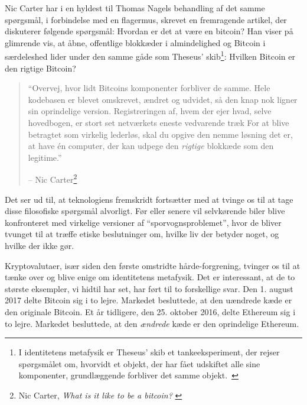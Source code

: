 \documentclass[paper=6in:9in,pagesize=pdftex,headinclude=on,footinclude=on,12pt]{scrbook}
\begin{document}
Nic Carter har i en hyldest til Thomas Nagels behandling af det samme spørgsmål, i forbindelse med en flagermus, skrevet en fremragende artikel, der diskuterer følgende spørgsmål: Hvordan er det at være en bitcoin? Han viser på glimrende vis, at åbne, offentlige blokkæder i almindelighed og Bitcoin i særdeleshed lider under den samme gåde som Theseus' skib\footnote{I identitetens metafysik er Theseus' skib et tankeeksperiment, der rejser spørgsmålet om, hvorvidt et objekt, der har fået udskiftet alle sine komponenter, grundlæggende forbliver det samme objekt.~\cite{wiki:theseus}}: Hvilken Bitcoin er den rigtige Bitcoin?\begin{quotation}\begin{samepage} \enquote{Overvej, hvor lidt Bitcoins komponenter forbliver de samme. Hele kodebasen er blevet omskrevet, ændret og udvidet, så den knap nok ligner sin oprindelige version. \href{...}{} Registreringen af, hvem der ejer hvad, selve hovedbogen, er stort set netværkets eneste vedvarende træk \href{...}{} For at blive betragtet som virkelig lederløs, skal du opgive den nemme løsning det er, at have \'en computer, der kan udpege den \textit{rigtige} blokkæde som den legitime.} \begin{flushright} -- Nic Carter\footnote{Nic Carter, \textit{What is it like to be a bitcoin?} \cite{bitcoin-identity}}
\end{flushright}\end{samepage}\end{quotation}

Det ser ud til, at teknologiens fremskridt fortsætter med at tvinge os til at tage disse filosofiske spørgsmål alvorligt. Før eller senere vil selvkørende biler blive konfronteret med virkelige versioner af \enquote{sporvognsproblemet}, hvor de bliver tvunget til at træffe etiske beslutninger om, hvilke liv der betyder noget, og hvilke der ikke gør.

Kryptovalutaer, især siden den første omstridte hårde-forgrening, tvinger os til at tænke over og blive enige om identitetens metafysik. Det er interessant, at de to største eksempler, vi hidtil har set, har ført til to forskellige svar. Den 1. august 2017 delte Bitcoin sig i to lejre. Markedet besluttede, at den uændrede kæde er den originale Bitcoin. Et år tidligere, den 25. oktober 2016, delte Ethereum sig i to lejre. Markedet besluttede, at den \textit{ændrede} kæde er den oprindelige Ethereum.
\end{document}
